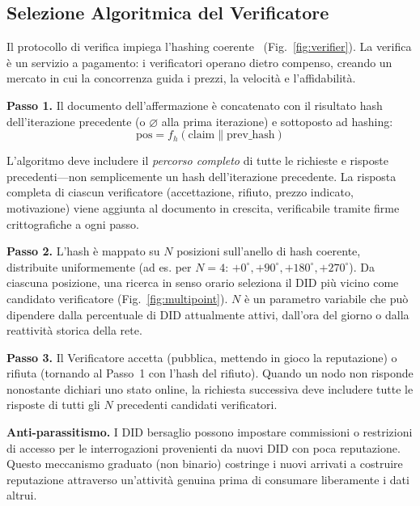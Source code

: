 \documentclass[11pt,a4paper,twocolumn]{article}
\begin{document}
\subsection{Selezione Algoritmica del Verificatore}

Il protocollo di verifica impiega l'hashing coerente~\cite{karger1997} (Fig.~\ref{fig:verifier}). La verifica è un servizio a pagamento: i verificatori operano dietro compenso, creando un mercato in cui la concorrenza guida i prezzi, la velocità e l'affidabilità.

\textbf{Passo 1.} Il documento dell'affermazione è concatenato con il risultato hash dell'iterazione precedente (o $\varnothing$ alla prima iterazione) e sottoposto ad hashing:
\begin{equation}
\text{pos} = f_h(\text{claim} \| \text{prev\_hash})
\label{eq:hash}
\end{equation}

L'algoritmo deve includere il \emph{percorso completo} di tutte le richieste e risposte precedenti---non semplicemente un hash dell'iterazione precedente. La risposta completa di ciascun verificatore (accettazione, rifiuto, prezzo indicato, motivazione) viene aggiunta al documento in crescita, verificabile tramite firme crittografiche a ogni passo.

\textbf{Passo 2.} L'hash è mappato su $N$ posizioni sull'anello di hash coerente, distribuite uniformemente (ad es. per $N=4$: $+0^{\circ}, +90^{\circ}, +180^{\circ}, +270^{\circ}$). Da ciascuna posizione, una ricerca in senso orario seleziona il DID più vicino come candidato verificatore (Fig.~\ref{fig:multipoint}). $N$ è un parametro variabile che può dipendere dalla percentuale di DID attualmente attivi, dall'ora del giorno o dalla reattività storica della rete.

\textbf{Passo 3.} Il Verificatore accetta (pubblica, mettendo in gioco la reputazione) o rifiuta (tornando al Passo~1 con l'hash del rifiuto). Quando un nodo non risponde nonostante dichiari uno stato online, la richiesta successiva deve includere tutte le risposte di tutti gli $N$ precedenti candidati verificatori.

\textbf{Anti-parassitismo.} I DID bersaglio possono impostare commissioni o restrizioni di accesso per le interrogazioni provenienti da nuovi DID con poca reputazione. Questo meccanismo graduato (non binario) costringe i nuovi arrivati a costruire reputazione attraverso un'attività genuina prima di consumare liberamente i dati altrui.
\end{document}
